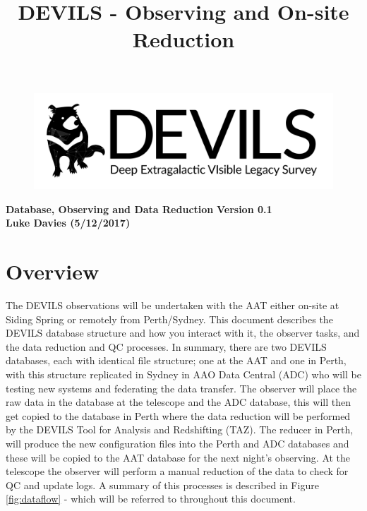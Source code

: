 \documentclass[12pt]{article}
\begin{document}
\title{DEVILS - Observing and On-site Reduction}
\begin{center}

\begin{figure}
\begin{center}
\includegraphics[scale=0.8]{devils-logo_big.png}
\end{center}
\end{figure}

\Huge {\textcolor{PineGreen}{\textbf{Database, Observing and Data Reduction}}}
\Huge {\textcolor{PineGreen}{\textbf{ Version 0.1}}}\\
\Large \textbf{Luke Davies (5/12/2017)}\\
\end{center}
\normalsize


\section{Overview}

The DEVILS observations will be undertaken with the AAT either on-site at Siding Spring or remotely from Perth/Sydney. This document describes the DEVILS database structure and how you interact with it, the observer tasks, and the data reduction and QC processes. In summary, there are two DEVILS databases, each with identical file structure; one at the AAT and one in Perth, with this structure replicated in Sydney in AAO Data Central (ADC) who will be testing new systems and federating the data transfer. The observer will place the raw data in the database at the telescope and the ADC database, this will then get copied to the database in Perth where the data reduction will be performed by the DEVILS Tool for Analysis and Redshifting (TAZ). The reducer in Perth, will produce the new configuration files into the Perth and ADC databases and these will be copied to the AAT database for the next night's observing. At the telescope the observer will perform a manual reduction of the data to check for QC and update logs. A summary of this processes is described in Figure \ref{fig:dataflow} - which will be referred to throughout this document. 
\end{document}
